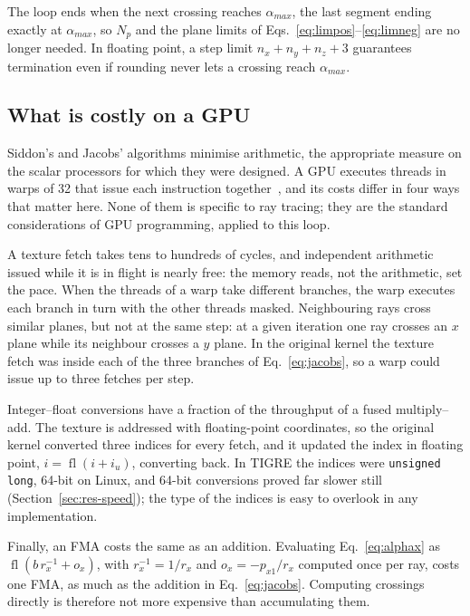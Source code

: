 \documentclass[11pt,a4paper]{article}
\theoremstyle{remark}
\newcommand{\fl}{\operatorname{fl}}
\begin{document}
The loop ends when the next crossing reaches $\alpha_{max}$, the last segment ending exactly at
$\alpha_{max}$, so $N_p$ and the plane limits of Eqs.~\eqref{eq:limpos}--\eqref{eq:limneg} are no longer
needed. In floating point, a step limit $n_x+n_y+n_z+3$ guarantees termination even if rounding never lets
a crossing reach $\alpha_{max}$.

\subsection{What is costly on a GPU}
\label{sec:gpucost}

Siddon's and Jacobs' algorithms minimise arithmetic, the appropriate measure on the scalar processors for
which they were designed. A GPU executes threads in warps of 32 that issue each instruction
together~\cite{cudaguide}, and its costs differ in four ways that matter here. None of them is specific to
ray tracing; they are the standard considerations of GPU programming, applied to this loop.

A texture fetch takes tens to hundreds of cycles, and independent arithmetic issued while it is in flight
is nearly free: the memory reads, not the arithmetic, set the pace. When the threads of a warp take
different branches, the warp executes each branch in turn with the other threads masked. Neighbouring rays
cross similar planes, but not at the same step: at a given iteration one ray crosses an $x$ plane while its
neighbour crosses a $y$ plane. In the original kernel the texture fetch was inside each of the three
branches of Eq.~\eqref{eq:jacobs}, so a warp could issue up to three fetches per step.

Integer--float conversions have a fraction of the throughput of a fused multiply--add. The texture is
addressed with floating-point coordinates, so the original kernel converted three indices for every fetch,
and it updated the index in floating point, $i=\fl(i+i_u)$, converting back. In TIGRE the indices were
\texttt{unsigned long}, 64-bit on Linux, and 64-bit conversions proved far slower still
(Section~\ref{sec:res-speed}); the type of the indices is easy to overlook in any implementation.

Finally, an FMA costs the same as an addition. Evaluating Eq.~\eqref{eq:alphax} as
$\fl(b\,r_x^{-1}+o_x)$, with $r_x^{-1}=1/r_x$ and $o_x=-p_{x1}/r_x$ computed once per ray, costs one FMA, as
much as the addition in Eq.~\eqref{eq:jacobs}. Computing crossings directly is therefore not more expensive
than accumulating them.
\end{document}
